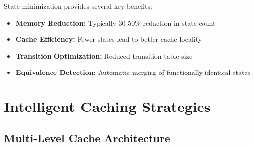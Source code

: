 \documentclass[11pt,a4paper]{article}
\begin{document}
State minimization provides several key benefits:

\begin{itemize}
    \item \textbf{Memory Reduction:} Typically 30-50\% reduction in state count
    \item \textbf{Cache Efficiency:} Fewer states lead to better cache locality
    \item \textbf{Transition Optimization:} Reduced transition table size
    \item \textbf{Equivalence Detection:} Automatic merging of functionally identical states
\end{itemize}

\section{Intelligent Caching Strategies}

\subsection{Multi-Level Cache Architecture}
\end{document}
